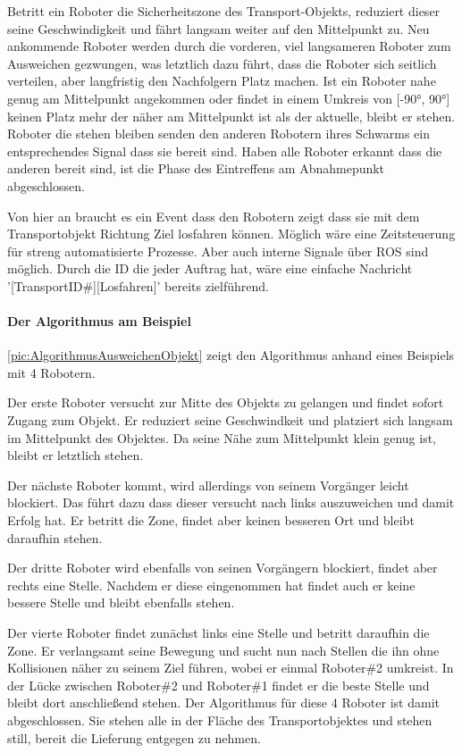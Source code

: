 Betritt ein Roboter die Sicherheitszone des Transport-Objekts, reduziert dieser seine Geschwindigkeit und fährt langsam weiter auf den Mittelpunkt zu. Neu ankommende Roboter werden durch die vorderen, viel langsameren Roboter zum Ausweichen gezwungen, was letztlich dazu führt, dass die Roboter sich seitlich verteilen, aber langfristig den Nachfolgern Platz machen. Ist ein Roboter nahe genug am Mittelpunkt angekommen oder findet in einem Umkreis von [-90°, 90°] keinen Platz mehr der näher am Mittelpunkt ist als der aktuelle, bleibt er stehen. Roboter die stehen bleiben senden den anderen Robotern ihres Schwarms ein entsprechendes Signal dass sie bereit sind. Haben alle Roboter erkannt dass die anderen bereit sind, ist die Phase des Eintreffens am Abnahmepunkt abgeschlossen.

Von hier an braucht es ein Event dass den Robotern zeigt dass sie mit dem Transportobjekt Richtung Ziel losfahren können. Möglich wäre eine Zeitsteuerung für streng automatisierte Prozesse. Aber auch interne Signale über ROS sind möglich. Durch die ID die jeder Auftrag hat, wäre eine einfache Nachricht '[TransportID\#][Losfahren]' bereits zielführend.

\paragraph*{Der Algorithmus am Beispiel}
\autoref{pic:AlgorithmusAusweichenObjekt} zeigt den Algorithmus anhand eines Beispiels mit 4 Robotern.

Der erste Roboter versucht zur Mitte des Objekts zu gelangen und findet sofort Zugang zum Objekt. Er reduziert seine Geschwindkeit und platziert sich langsam im Mittelpunkt des Objektes. Da seine Nähe zum Mittelpunkt klein genug ist, bleibt er letztlich stehen.

Der nächste Roboter kommt, wird allerdings von seinem Vorgänger leicht blockiert. Das führt dazu dass dieser versucht nach links auszuweichen und damit Erfolg hat. Er betritt die Zone, findet aber keinen besseren Ort und bleibt daraufhin stehen.

Der dritte Roboter wird ebenfalls von seinen Vorgängern blockiert, findet aber rechts eine Stelle. Nachdem er diese eingenommen hat findet auch er keine bessere Stelle und bleibt ebenfalls stehen.

Der vierte Roboter findet zunächst links eine Stelle und betritt daraufhin die Zone. Er verlangsamt seine Bewegung und sucht nun nach Stellen die ihn ohne Kollisionen näher zu seinem Ziel führen, wobei er einmal Roboter\#2 umkreist. In der Lücke zwischen Roboter\#2 und Roboter\#1 findet er die beste Stelle und bleibt dort anschließend stehen. Der Algorithmus für diese 4 Roboter ist damit abgeschlossen. Sie stehen alle in der Fläche des Transportobjektes und stehen still, bereit die Lieferung entgegen zu nehmen.

